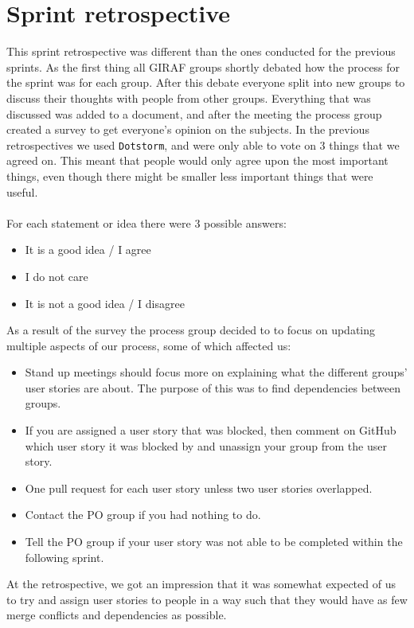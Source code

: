 \section{Sprint retrospective}\label{sprint-3-retrospective}
This sprint retrospective was different than the ones conducted for the previous sprints.
As the first thing all GIRAF groups shortly debated how the process for the sprint was for each group.
After this debate everyone split into new groups to discuss their thoughts with people from other groups.
Everything that was discussed was added to a document, and after the meeting the process group created a survey to get everyone's opinion on the subjects.
In the previous retrospectives we used \texttt{Dotstorm}, and were only able to vote on 3 things that we agreed on.
This meant that people would only agree upon the most important things, even though there might be smaller less important things that were useful.
\\\\
For each statement or idea there were 3 possible answers:
\begin{itemize}
    \item It is a good idea / I agree
    \item I do not care
    \item It is not a good idea / I disagree
\end{itemize}
As a result of the survey the process group decided to to focus on updating multiple aspects of our process, some of which affected us:
\begin{itemize}
    \item Stand up meetings should focus more on explaining what the different groups' user stories are about. The purpose of this was to find dependencies between groups.
    \item If you are assigned a user story that was blocked, then comment on GitHub which user story it was blocked by and unassign your group from the user story.
    \item One pull request for each user story unless two user stories overlapped.
    \item Contact the PO group if you had nothing to do.
    \item Tell the PO group if your user story was not able to be completed within the following sprint.
\end{itemize}
\noindent
At the retrospective, we got an impression that it was somewhat expected of us to try and assign user stories to people in a way such that they would have as few merge conflicts and dependencies as possible.
